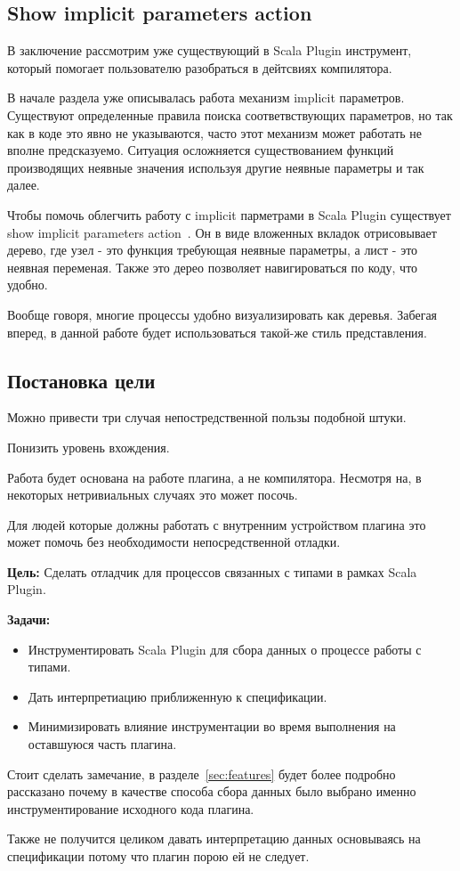 
\subsection{Show implicit parameters action}
\label{sec:showImplicit}

В заключение рассмотрим уже существующий в Scala Plugin инструмент, который
помогает пользователю разобраться в дейтсвиях компилятора.

В начале раздела уже описывалась работа механизм implicit параметров.
Существуют определенные правила поиска соответвствующих параметров,
но так как в коде это явно не указываются, часто этот механизм
может работать не вполне предсказуемо.
Ситуация осложняется существованием функций производящих неявные значения
используя другие неявные параметры и так далее.

Чтобы помочь облегчить работу с implicit парметрами в Scala Plugin существует
show implicit parameters action~\cite{show_implicit}.
Он в виде вложенных вкладок отрисовывает дерево, где узел - это функция требующая
неявные параметры, а лист - это неявная переменая.
Также это дерео позволяет навигироваться по коду, что удобно.

Вообще говоря, многие процессы удобно визуализировать как деревья.
Забегая вперед, в данной работе будет использоваться такой-же стиль
представления.

\subsection{Постановка цели}

Можно привести три случая непостредственной пользы подобной штуки.

Понизить уровень вхождения.

Работа будет основана на работе плагина, а не компилятора.
Несмотря на, в некоторых нетривиальных случаях это может посочь.

Для людей которые должны работать с внутренним устройством плагина это может
помочь без необходимости непосредственной отладки.

\textbf{Цель:}
Сделать отладчик для процессов связанных с типами в рамках Scala Plugin.

\textbf{Задачи:}
\begin{itemize}
  \item Инструментировать Scala Plugin для сбора данных о процессе работы с типами.
  \item Дать интерпретиацию приближенную к спецификации.
  \item Минимизировать влияние инструментации во время выполнения на оставшуюся
  часть плагина.
\end{itemize}

Стоит сделать замечание, в разделе~\ref{sec:features} будет более подробно
рассказано почему в качестве способа сбора данных было выбрано именно
инструментирование исходного кода плагина.

Также не получится целиком давать интерпретацию данных основываясь на спецификации
потому что плагин порою ей не следует.
